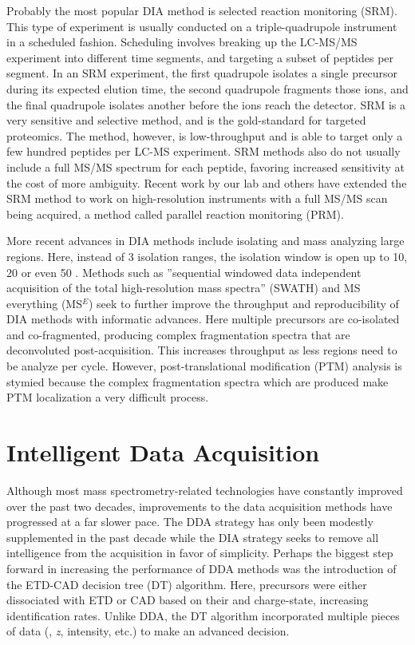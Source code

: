 Probably the most popular DIA method is selected reaction monitoring (SRM).\cite{mrm2,mrm3} This type of experiment is usually conducted on a triple-quadrupole instrument in a scheduled fashion. Scheduling involves breaking up the LC-MS/MS experiment into different time segments, and targeting a subset of peptides per segment. In an SRM experiment, the first quadrupole isolates a single precursor during its expected elution time, the second quadrupole fragments those ions, and the final quadrupole isolates another \mz{} before the ions reach the detector. SRM is a very sensitive and selective method, and is the gold-standard for targeted proteomics. The method, however, is low-throughput and is able to target only a few hundred peptides per LC-MS experiment.\cite{} SRM methods also do not usually include a full MS/MS spectrum for each peptide, favoring increased sensitivity at the cost of more ambiguity. Recent work by our lab and others have extended the SRM method to work on high-resolution instruments with a full MS/MS scan being acquired, a method called parallel reaction monitoring (PRM).\cite{prm1,prm2} 

More recent advances in DIA methods include isolating and mass analyzing large \mz{} regions. Here, instead of 3 \mz{} isolation ranges, the isolation window is open up to 10, 20 or even 50 \mz{}. Methods such as ''sequential windowed data independent acquisition of the total high-resolution mass spectra'' (SWATH) and MS everything (MS$^E$) seek to further improve the throughput and reproducibility of DIA methods with informatic advances.\cite{swath,mse} Here multiple precursors are co-isolated and co-fragmented, producing complex fragmentation spectra that are deconvoluted post-acquisition. This increases throughput as less \mz{} regions need to be analyze per cycle. However, post-translational modification (PTM) analysis is stymied because the complex fragmentation spectra which are produced make PTM localization a very difficult process.

\section{Intelligent Data Acquisition}
Although most mass spectrometry-related technologies have constantly improved over the past two decades, improvements to the data acquisition methods have progressed at a far slower pace. The DDA strategy has only been modestly supplemented in the past decade while the DIA strategy seeks to remove all intelligence from the acquisition in favor of simplicity. Perhaps the biggest step forward in increasing the performance of DDA methods was the introduction of the ETD-CAD decision tree (DT) algorithm.\cite{decisiontree} Here, precursors were either dissociated with ETD or CAD based on their \mz{} and charge-state, increasing identification rates. Unlike DDA, the DT algorithm incorporated multiple pieces of data (\mz{}, \emph{z}, intensity, etc.) to make an advanced decision.

